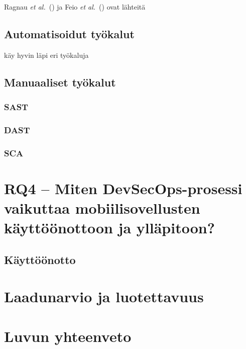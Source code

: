 \documentclass[bscthesis,finnish,oneside,biblatex]{uefcsthesis}
\begin{document}
Ragnau \emph{et al.}\ (\citeyear{rangnau2020_cst}) ja
Feio \emph{et al.}\ (\citeyear{feio2024_empirical}) ovat lähteitä

\subsection{Automatisoidut työkalut}

\cite{feio2024_empirical} käy hyvin läpi eri työkaluja

\subsection{Manuaaliset työkalut}

\subsubsection{SAST}

\subsubsection{DAST}

\subsubsection{SCA}

\section{RQ4 – Miten DevSecOps-prosessi vaikuttaa mobiilisovellusten käyttöönottoon ja ylläpitoon?}
\label{sec:rq4}


\subsection{Käyttöönotto}

\section{Laadunarvio ja luotettavuus}

\section{Luvun yhteenveto}
\end{document}
